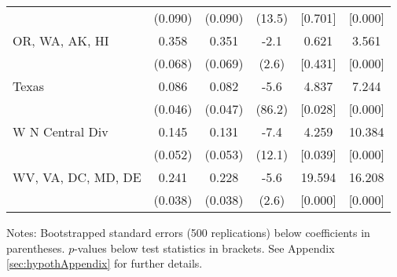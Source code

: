 \begin{landscape}
\begin{table}[ht]
{\begin{threeparttable}
\begin{tabular}{lccccc}
 & (0.090) & (0.090) & (13.5) & [0.701] & [0.000] \\ 
OR, WA, AK, HI & 0.358 & 0.351 & -2.1 & 0.621 & 3.561 \\ 
 & (0.068) & (0.069) & (2.6) & [0.431] & [0.000] \\ 
Texas & 0.086 & 0.082 & -5.6 & 4.837 & 7.244 \\ 
 & (0.046) & (0.047) & (86.2) & [0.028] & [0.000] \\ 
W N Central Div & 0.145 & 0.131 & -7.4 & 4.259 & 10.384 \\ 
 & (0.052) & (0.053) & (12.1) & [0.039] & [0.000] \\ 
WV, VA, DC, MD, DE & 0.241 & 0.228 & -5.6 & 19.594 & 16.208 \\ 
 & (0.038) & (0.038) & (2.6) & [0.000] & [0.000] \\ 
\bottomrule
\end{tabular}
{\footnotesize {\raggedright Notes: Bootstrapped standard errors (500 replications) below coefficients in parentheses. $p$-values below test statistics in brackets. See Appendix \ref{sec:hypothAppendix} for further details.}}
\end{threeparttable}
}
\end{table}
\end{landscape}
